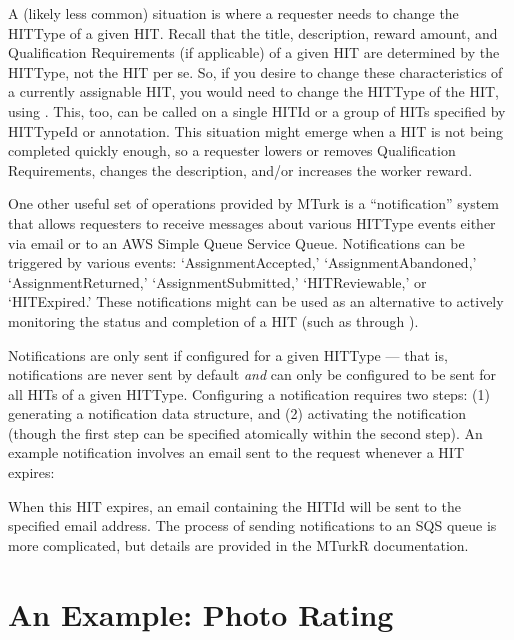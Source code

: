 A (likely less common) situation is where a requester needs to change the HITType of a given HIT. Recall that the title, description, reward amount, and Qualification Requirements (if applicable) of a given HIT are determined by the HITType, not the HIT per se. So, if you desire to change these characteristics of a currently assignable HIT, you would need to change the HITType of the HIT, using . This, too, can be called on a single HITId or a group of HITs specified by HITTypeId or annotation. This situation might emerge when a HIT is not being completed quickly enough, so a requester lowers or removes Qualification Requirements, changes the description, and/or increases the worker reward.

One other useful set of operations provided by MTurk is a ``notification'' system that allows requesters to receive messages about various HITType events either via email or to an AWS Simple Queue Service Queue. Notifications can be triggered by various events: `AssignmentAccepted,' `AssignmentAbandoned,' `AssignmentReturned,' `AssignmentSubmitted,' `HITReviewable,' or `HITExpired.' These notifications might can be used as an alternative to actively monitoring the status and completion of a HIT (such as through ). 

Notifications are only sent if configured for a given HITType --- that is, notifications are never sent by default \emph{and} can only be configured to be sent for all HITs of a given HITType. Configuring a notification requires two steps: (1) generating a notification data structure, and (2) activating the notification (though the first step can be specified atomically within the second step). An example notification involves an email sent to the request whenever a HIT expires:


\noindent When this HIT expires, an email containing the HITId will be sent to the specified email address. The process of sending notifications to an SQS queue is more complicated, but details are provided in the MTurkR documentation.

\section{An Example: Photo Rating}

